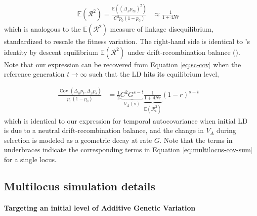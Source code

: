 \documentclass[11pt]{article}
\newcommand{\E}{\mathbb{E}}
\DeclareMathOperator{\cov}{Cov}
\begin{document}
\begin{align}
  \E(\mathcal{R}^2) = \frac{\E((\Delta_{_H} p_\infty)^2)}{C^2 p_0(1-p_0)} &\approx \frac{1}{1 + 4Nr}
\end{align}
%
which is analogous to the $\E(\mathcal{R}^2)$ measure of linkage disequilibrium,
standardized to rescale the fitness variation. The right-hand side is identical
to \citeauthor{Sved1971-dv}'s identity by descent equilibrium $\E(\mathcal{R}^2)$ under
drift-recombination balance (\citeyear{Sved1971-dv}). Note that our expression
can be recovered from Equation \eqref{eq:sc-cov} when the reference generation
$t \to \infty$ such that the LD hits its equilibrium level,

\begin{align}
  \frac{\cov(\Delta_{_H} p_t, \Delta_{_H} p_s)}{p_0(1-p_0)} &= \frac{1}{2} \underbrace{C^2 G^{s-t}}_{V_A(s)} \underbrace{\frac{1}{1 + 4Nr}}_{\E(\mathcal{R}_t^2)} (1-r)^{s-t}
\end{align}
%
which is identical to our expression for temporal autocovariance when initial
LD is due to a neutral drift-recombination balance, and the change in $V_A$
during selection is modeled as a geometric decay at rate $G$.  Note that the
terms in underbraces indicate the corresponding terms in Equation
\eqref{eq:multilocus-cov-sum} for a single locus.

\subsection{Multilocus simulation details}
\label{sec:supp-ml-sim}

\paragraph{Targeting an initial level of Additive Genetic Variation}
\label{sec:supp-ml-sim-va}
\end{document}
